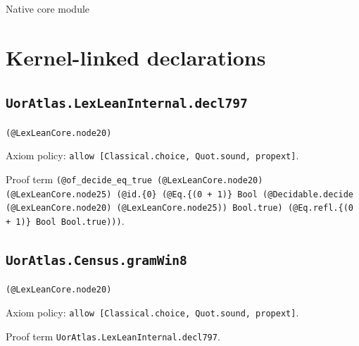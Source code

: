 \documentclass[11pt]{article}
\begin{document}
\begin{center}{\LARGE Native core module}\end{center}
\section*{Kernel-linked declarations}
\subsection*{\texttt{UorAtlas.LexLeanInternal.decl797}}
\noindent\texttt{(@LexLeanCore.node20)}\par
\noindent Axiom policy: \texttt{allow [Classical.choice, Quot.sound, propext]}.\par
\noindent Proof term \texttt{(@of\_decide\_eq\_true (@LexLeanCore.node20) (@LexLeanCore.node25) (@id.\{0\} (@Eq.\{(0 + 1)\} Bool (@Decidable.decide (@LexLeanCore.node20) (@LexLeanCore.node25)) Bool.true) (@Eq.refl.\{(0 + 1)\} Bool Bool.true)))}.\par
\subsection*{\texttt{UorAtlas.Census.gramWin8}}
\noindent\texttt{(@LexLeanCore.node20)}\par
\noindent Axiom policy: \texttt{allow [Classical.choice, Quot.sound, propext]}.\par
\noindent Proof term \texttt{UorAtlas.LexLeanInternal.decl797}.\par
\end{document}
